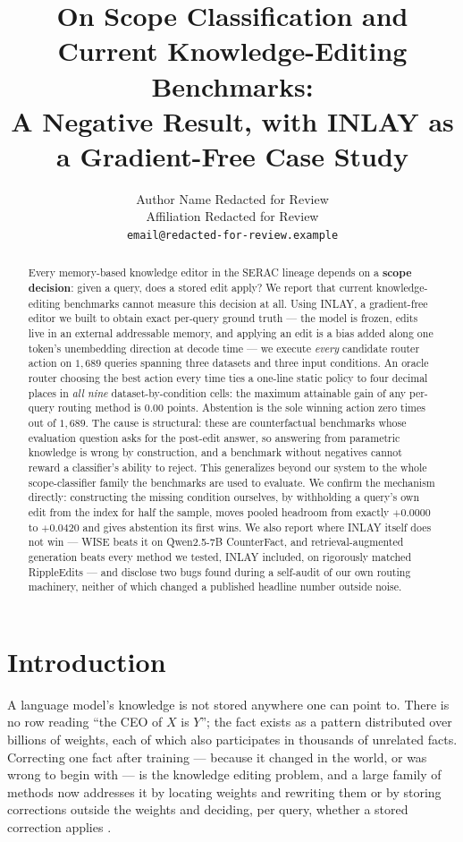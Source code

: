 \documentclass[11pt]{article}
\title{On Scope Classification and Current Knowledge-Editing Benchmarks:\\
A Negative Result, with INLAY as a Gradient-Free Case Study}
\author{Author Name Redacted for Review \\
  Affiliation Redacted for Review \\
  \texttt{email@redacted-for-review.example}}
\begin{document}
\maketitle

\begin{abstract}
Every memory-based knowledge editor in the SERAC lineage depends on a
\textbf{scope decision}: given a query, does a stored edit apply? We report
that current knowledge-editing benchmarks cannot measure this decision at
all. Using INLAY, a gradient-free editor we built to obtain exact per-query
ground truth --- the model is frozen, edits live in an external addressable
memory, and applying an edit is a bias added along one token's unembedding
direction at decode time --- we execute \emph{every} candidate router action
on $1{,}689$ queries spanning three datasets and three input conditions. An
oracle router choosing the best action every time ties a one-line static
policy to four decimal places in \emph{all nine} dataset-by-condition cells:
the maximum attainable gain of any per-query routing method is $0.00$ points.
Abstention is the sole winning action zero times out of $1{,}689$. The cause
is structural: these are counterfactual benchmarks whose evaluation question
asks for the post-edit answer, so answering from parametric knowledge is
wrong by construction, and a benchmark without negatives cannot reward a
classifier's ability to reject. This generalizes beyond our system to the
whole scope-classifier family the benchmarks are used to evaluate. We confirm
the mechanism directly: constructing the missing condition ourselves, by
withholding a query's own edit from the index for half the sample, moves
pooled headroom from exactly $+0.0000$ to $+0.0420$ and gives abstention its
first wins. We also
report where INLAY itself does not win --- WISE beats it on Qwen2.5-7B
CounterFact, and retrieval-augmented generation beats every method we tested,
INLAY included, on rigorously matched RippleEdits --- and disclose two bugs
found during a self-audit of our own routing machinery, neither of which
changed a published headline number outside noise.
\end{abstract}

\section{Introduction}
\label{sec:intro}

A language model's knowledge is not stored anywhere one can point to. There is
no row reading ``the CEO of $X$ is $Y$''; the fact exists as a pattern
distributed over billions of weights, each of which also participates in
thousands of unrelated facts. Correcting one fact after training --- because
it changed in the world, or was wrong to begin with --- is the knowledge
editing problem, and a large family of methods now addresses it by locating
weights and rewriting them \citep{meng2022rome,meng2023memit,fang2025alphaedit}
or by storing corrections outside the weights and deciding, per query, whether
a stored correction applies \citep{mitchell2022serac,hartvigsen2023grace,wang2024wise}.
\end{document}
